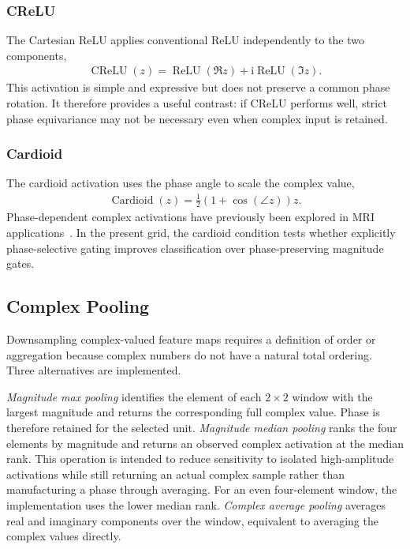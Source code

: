 \documentclass[journal]{IEEEtran}
\begin{document}
\subsubsection{CReLU}
The Cartesian ReLU applies conventional ReLU independently to the two components,
\begin{align}
\operatorname{CReLU}(z)
= \operatorname{ReLU}(\Re z)
+\mathrm{i}\operatorname{ReLU}(\Im z).
\end{align}
This activation is simple and expressive but does not preserve a common phase rotation. It therefore provides a useful contrast: if CReLU performs well, strict phase equivariance may not be necessary even when complex input is retained.

\subsubsection{Cardioid}
The cardioid activation uses the phase angle to scale the complex value,
\begin{align}
\operatorname{Cardioid}(z)
= \frac{1}{2}\left(1+\cos(\angle z)\right)z.
\end{align}
Phase-dependent complex activations have previously been explored in MRI applications~\cite{Virtue2017ComplexActivation}. In the present grid, the cardioid condition tests whether explicitly phase-selective gating improves classification over phase-preserving magnitude gates.

\subsection{Complex Pooling}
Downsampling complex-valued feature maps requires a definition of order or aggregation because complex numbers do not have a natural total ordering. Three alternatives are implemented.

\textit{Magnitude max pooling} identifies the element of each $2\times2$ window with the largest magnitude and returns the corresponding full complex value. Phase is therefore retained for the selected unit. \textit{Magnitude median pooling} ranks the four elements by magnitude and returns an observed complex activation at the median rank. This operation is intended to reduce sensitivity to isolated high-amplitude activations while still returning an actual complex sample rather than manufacturing a phase through averaging. For an even four-element window, the implementation uses the lower median rank. \textit{Complex average pooling} averages real and imaginary components over the window, equivalent to averaging the complex values directly.
\end{document}
